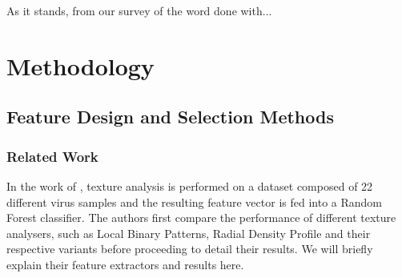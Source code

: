 \begin{multicols}{2}
As it stands, from our survey of the word done with...

\section{Methodology}

\subsection{Feature Design and Selection Methods}

\subsubsection{Related Work}
In the work of \citet{kylberg2011virus}, texture analysis is performed on a dataset composed of 22 different  virus samples and the resulting feature vector is fed into a Random Forest classifier. The authors first compare the performance of different texture analysers, such as Local Binary Patterns, Radial Density Profile and their respective variants before proceeding to detail their results. We will briefly explain their feature extractors and results here. 

\end{multicols}
